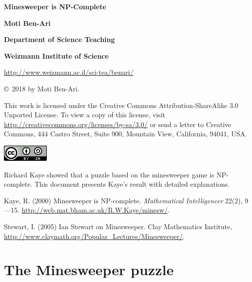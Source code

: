 \documentclass[11pt,a4paper]{article}
\begin{document}
\begin{center}

\textbf{\huge Minesweeper is NP-Complete}

\bigskip
\bigskip
\bigskip

\textbf{\LARGE Moti Ben-Ari}

\bigskip

\textbf{\Large Department of Science Teaching}

\bigskip

\textbf{\Large Weizmann Institute of Science}

\bigskip

\url{http://www.weizmann.ac.il/sci-tea/benari/}

\end{center}

\bigskip
\bigskip

\begin{center}
\copyright{}\  2018 by Moti Ben-Ari.
\end{center}

This work is licensed under the Creative Commons Attribution-ShareAlike 3.0 Unported License. To view a copy of this license, visit \url{http://creativecommons.org/licenses/by-sa/3.0/} or send a letter to Creative Commons, 444 Castro Street, Suite 900, Mountain View, California, 94041, USA.

\bigskip

\begin{center}
\includegraphics[width=.2\textwidth]{../by-sa.png}
\end{center}

\thispagestyle{empty}

\newpage

Richard Kaye showed that a puzzle based on the minesweeper game is NP-complete. This document presents Kaye's result with detailed explanations.

Kaye, R. (2000) Minesweeper is NP-complete. \textit{Mathematical Intelligencer} 22(2), 9—15. \url{http://web.mat.bham.ac.uk/R.W.Kaye/minesw/}.

Stewart, I. (2005) Ian Stewart on Minesweeper. Clay Mathematics Institute, 
\url{http://www.claymath.org/Popular_Lectures/Minesweeper/}.


\section{The Minesweeper puzzle}
\end{document}
